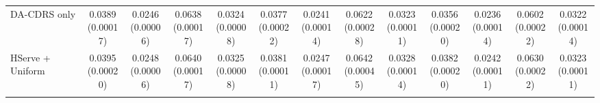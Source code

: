 \begin{table}[t]
\begin{tabular*}{\textwidth}{@{\extracolsep{\fill}} l *{12}{c} @{}}
DA-CDRS only & \shortstack[c]{0.0389\\[-1pt]{\tiny(0.00017)}} & \shortstack[c]{0.0246\\[-1pt]{\tiny(0.00006)}} & \shortstack[c]{0.0638\\[-1pt]{\tiny(0.00017)}} & \shortstack[c]{0.0324\\[-1pt]{\tiny(0.00008)}} & \shortstack[c]{0.0377\\[-1pt]{\tiny(0.00022)}} & \shortstack[c]{0.0241\\[-1pt]{\tiny(0.00014)}} & \shortstack[c]{0.0622\\[-1pt]{\tiny(0.00028)}} & \shortstack[c]{0.0323\\[-1pt]{\tiny(0.00011)}} & \shortstack[c]{0.0356\\[-1pt]{\tiny(0.00020)}} & \shortstack[c]{0.0236\\[-1pt]{\tiny(0.00014)}} & \shortstack[c]{0.0602\\[-1pt]{\tiny(0.00022)}} & \shortstack[c]{0.0322\\[-1pt]{\tiny(0.00014)}} \\
HServe + Uniform & \shortstack[c]{0.0395\\[-1pt]{\tiny(0.00020)}} & \shortstack[c]{0.0248\\[-1pt]{\tiny(0.00006)}} & \shortstack[c]{0.0640\\[-1pt]{\tiny(0.00017)}} & \shortstack[c]{0.0325\\[-1pt]{\tiny(0.00008)}} & \shortstack[c]{0.0381\\[-1pt]{\tiny(0.00011)}} & \shortstack[c]{0.0247\\[-1pt]{\tiny(0.00017)}} & \shortstack[c]{0.0642\\[-1pt]{\tiny(0.00045)}} & \shortstack[c]{0.0328\\[-1pt]{\tiny(0.00014)}} & \shortstack[c]{0.0382\\[-1pt]{\tiny(0.00020)}} & \shortstack[c]{0.0242\\[-1pt]{\tiny(0.00011)}} & \shortstack[c]{0.0630\\[-1pt]{\tiny(0.00022)}} & \shortstack[c]{0.0323\\[-1pt]{\tiny(0.00011)}} \\
\addlinespace[1pt]

\end{tabular*}
\end{table}
